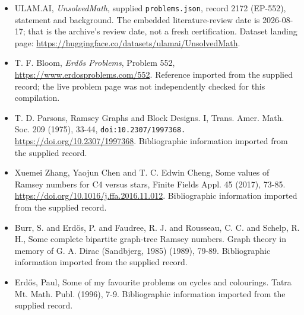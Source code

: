 \documentclass[11pt,a4paper]{article}
\begin{document}
{\small

\begin{itemize}

\item[\hypertarget{source:2172:1}{S1}] ULAM.AI, \emph{UnsolvedMath}, supplied \texttt{problems.json}, record 2172 (EP-552), statement and background. The embedded literature-review date is 2026-08-17; that is the archive’s review date, not a fresh certification. Dataset landing page: \url{https://huggingface.co/datasets/ulamai/UnsolvedMath}.

\item[\hypertarget{source:2172:2}{S2}] T. F. Bloom, \emph{Erdős Problems}, Problem 552, \url{https://www.erdosproblems.com/552}. Reference imported from the supplied record; the live problem page was not independently checked for this compilation.

\item[\hypertarget{source:2172:3}{S3}] T. D. Parsons, Ramsey Graphs and Block Designs. I, Trans. Amer. Math. Soc. 209 (1975), 33-44, \nolinkurl{doi:10.2307/1997368.} \url{https://doi.org/10.2307/1997368}. Bibliographic information imported from the supplied record.

\item[\hypertarget{source:2172:4}{S4}] Xuemei Zhang, Yaojun Chen and T. C. Edwin Cheng, Some values of Ramsey numbers for C4 versus stars, Finite Fields Appl. 45 (2017), 73-85. \url{https://doi.org/10.1016/j.ffa.2016.11.012}. Bibliographic information imported from the supplied record.

\item[\hypertarget{source:2172:5}{S5}] Burr, S. and Erd\"{o}s, P. and Faudree, R. J. and Rousseau, C. C. and Schelp, R. H., Some complete bipartite graph-tree Ramsey numbers. Graph theory in memory of G. A. Dirac (Sandbjerg, 1985) (1989), 79-89. Bibliographic information imported from the supplied record.

\item[\hypertarget{source:2172:6}{S6}] Erd\H{o}s, Paul, Some of my favourite problems on cycles and colourings. Tatra Mt. Math. Publ. (1996), 7-9. Bibliographic information imported from the supplied record.

\end{itemize}

}

\label{end:2172}
\end{document}
